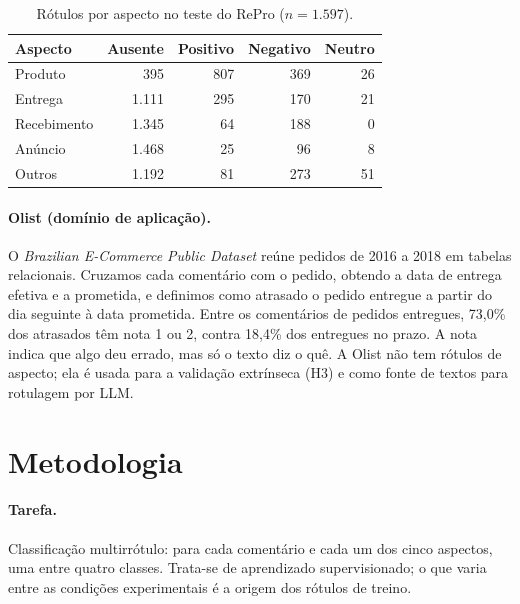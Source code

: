 \documentclass[12pt,a4paper]{article}
\begin{document}
\begin{table}[ht]
\centering
\caption{Rótulos por aspecto no teste do RePro ($n = 1.597$).}
\label{tab:dist}
\begin{tabular}{lrrrr}
\toprule
Aspecto & Ausente & Positivo & Negativo & Neutro \\
\midrule
Produto     &   395 & 807 & 369 & 26 \\
Entrega     & 1.111 & 295 & 170 & 21 \\
Recebimento & 1.345 &  64 & 188 &  0 \\
Anúncio     & 1.468 &  25 &  96 &  8 \\
Outros      & 1.192 &  81 & 273 & 51 \\
\bottomrule
\end{tabular}
\end{table}

\paragraph{Olist (domínio de aplicação).} O \emph{Brazilian E-Commerce Public Dataset} \citep{olist2018} reúne pedidos de 2016 a 2018 em tabelas relacionais. Cruzamos cada comentário com o pedido, obtendo a data de entrega efetiva e a prometida, e definimos como atrasado o pedido entregue a partir do dia seguinte à data prometida. Entre os comentários de pedidos entregues, 73,0\% dos atrasados têm nota 1 ou 2, contra 18,4\% dos entregues no prazo. A nota indica que algo deu errado, mas só o texto diz o quê. A Olist não tem rótulos de aspecto; ela é usada para a validação extrínseca (H3) e como fonte de textos para rotulagem por LLM.

\section{Metodologia}

\paragraph{Tarefa.} Classificação multirrótulo: para cada comentário e cada um dos cinco aspectos, uma entre quatro classes. Trata-se de aprendizado supervisionado; o que varia entre as condições experimentais é a origem dos rótulos de treino.
\end{document}
